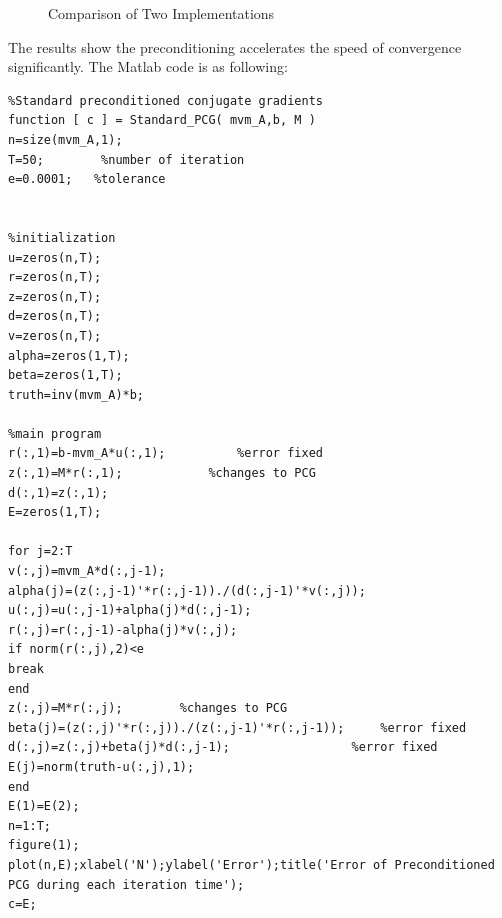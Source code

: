 \documentclass{article} %
\begin{document}
\begin{figure}[H]
	\centering
	\caption{Comparison of Two Implementations}
	\label{fig4}
\end{figure}
The results show the preconditioning accelerates the speed of convergence significantly. The Matlab code is as following:
\begin{lstlisting}
%Standard preconditioned conjugate gradients
function [ c ] = Standard_PCG( mvm_A,b, M )
n=size(mvm_A,1);
T=50;        %number of iteration
e=0.0001;   %tolerance


%initialization
u=zeros(n,T);
r=zeros(n,T);
z=zeros(n,T);
d=zeros(n,T);
v=zeros(n,T);
alpha=zeros(1,T);
beta=zeros(1,T);
truth=inv(mvm_A)*b;

%main program
r(:,1)=b-mvm_A*u(:,1);          %error fixed
z(:,1)=M*r(:,1);            %changes to PCG
d(:,1)=z(:,1);
E=zeros(1,T);

for j=2:T
v(:,j)=mvm_A*d(:,j-1);
alpha(j)=(z(:,j-1)'*r(:,j-1))./(d(:,j-1)'*v(:,j));
u(:,j)=u(:,j-1)+alpha(j)*d(:,j-1);
r(:,j)=r(:,j-1)-alpha(j)*v(:,j);
if norm(r(:,j),2)<e
break
end
z(:,j)=M*r(:,j);        %changes to PCG
beta(j)=(z(:,j)'*r(:,j))./(z(:,j-1)'*r(:,j-1));     %error fixed
d(:,j)=z(:,j)+beta(j)*d(:,j-1);                 %error fixed
E(j)=norm(truth-u(:,j),1);
end
E(1)=E(2);
n=1:T;
figure(1);
plot(n,E);xlabel('N');ylabel('Error');title('Error of Preconditioned PCG during each iteration time');
c=E;
\end{lstlisting}
\end{document}

